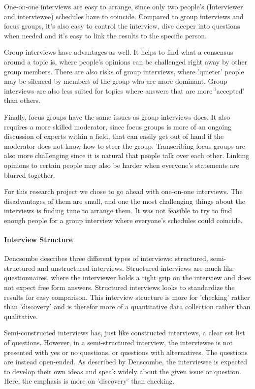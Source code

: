 \documentclass{article}
\begin{document}
One-on-one interviews are easy to arrange, since
only two people's (Interviewer and interviewee) schedules have to coincide.
Compared to group interviews and focus groups, it's also easy to control the interview,
dive deeper into questions when needed and it's easy to link the results
to the specific person.

Group interviews have advantages as well. It helps to find what a consensus around
a topic is, where people's opinions can be challenged right away by other group members.
There are also risks of group interviews, where 'quieter' people may be silenced by
members of the group who are more dominant. Group interviews are also less suited
for topics where answers that are more 'accepted' than others.

Finally, focus groups have the same issues as group interviews does. It also
requires a more skilled moderator, since focus groups is more of an ongoing
discussion of experts within a field, that can easily get out of hand if the
moderator does not know how to steer the group. Transcribing focus groups are also
more challenging since it is natural that people talk over each other. Linking opinions
to certain people may also be harder when everyone's statements are blurred together.

For this research project we chose to go ahead with one-on-one interviews.
The disadvantages of them are small, and one the most challenging things
about the interviews is finding time to arrange them. It was not feasible
to try to find enough people for a group interview where everyone's schedules
could coincide.

\paragraph{Interview Structure}
Dencsombe describes three different types of interviews: structured, semi-structured and
unstructured interviews. Structured interviews are much like questionnaires, where
the interviewer holds a tight grip on the interview and does not expect free form answers.
Structured interviews looks to standardize the results for easy comparison.
This interview structure is more for 'checking' rather than 'discovery' and is
therefor more of a quantitative data collection rather than qualitative.

Semi-constructed interviews has, just like constructed interviews, a clear set
list of questions. However, in a semi-structured interview, the interviewee
is not presented with yes or no questions, or questions with alternatives.
The questions are instead open-ended. As described by Denscombe, the interviewee
is expected to develop their own ideas and speak widely about the given issue or question.
Here, the emphasis is more on 'discovery' than checking.
\end{document}

